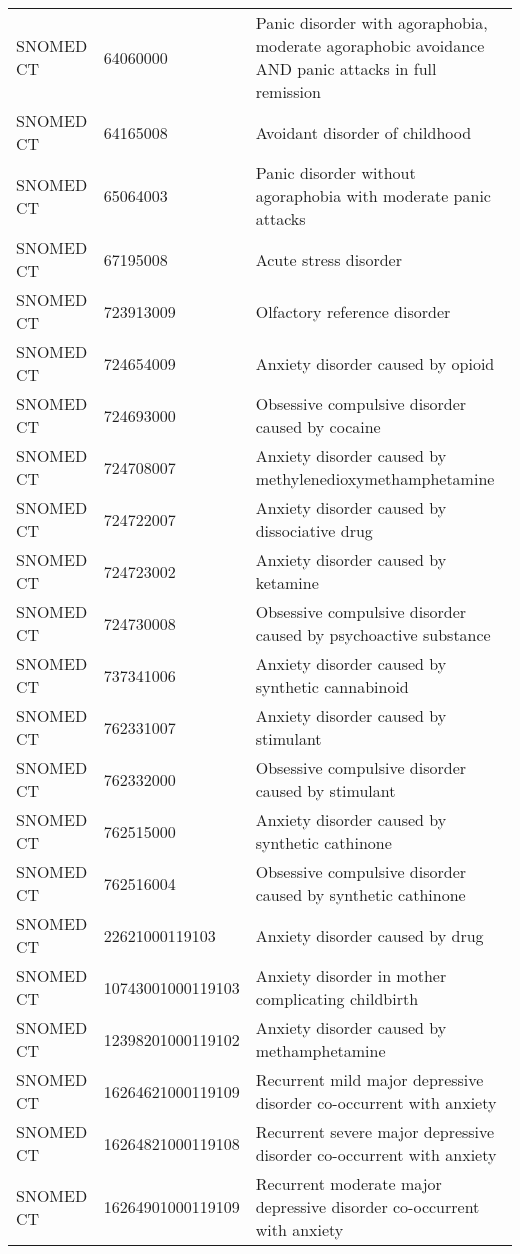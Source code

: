 \begin{longtable}{p{}p{}p{}}
  SNOMED CT & 64060000 & Panic disorder with agoraphobia, moderate agoraphobic avoidance AND panic attacks in full remission \\ 
  SNOMED CT & 64165008 & Avoidant disorder of childhood \\ 
  SNOMED CT & 65064003 & Panic disorder without agoraphobia with moderate panic attacks \\ 
  SNOMED CT & 67195008 & Acute stress disorder \\ 
  SNOMED CT & 723913009 & Olfactory reference disorder \\ 
  SNOMED CT & 724654009 & Anxiety disorder caused by opioid \\ 
  SNOMED CT & 724693000 & Obsessive compulsive disorder caused by cocaine \\ 
  SNOMED CT & 724708007 & Anxiety disorder caused by methylenedioxymethamphetamine \\ 
  SNOMED CT & 724722007 & Anxiety disorder caused by dissociative drug \\ 
  SNOMED CT & 724723002 & Anxiety disorder caused by ketamine \\ 
  SNOMED CT & 724730008 & Obsessive compulsive disorder caused by psychoactive substance \\ 
  SNOMED CT & 737341006 & Anxiety disorder caused by synthetic cannabinoid \\ 
  SNOMED CT & 762331007 & Anxiety disorder caused by stimulant \\ 
  SNOMED CT & 762332000 & Obsessive compulsive disorder caused by stimulant \\ 
  SNOMED CT & 762515000 & Anxiety disorder caused by synthetic cathinone \\ 
  SNOMED CT & 762516004 & Obsessive compulsive disorder caused by synthetic cathinone \\ 
  SNOMED CT & 22621000119103 & Anxiety disorder caused by drug \\ 
  SNOMED CT & 10743001000119103 & Anxiety disorder in mother complicating childbirth \\ 
  SNOMED CT & 12398201000119102 & Anxiety disorder caused by methamphetamine \\ 
  SNOMED CT & 16264621000119109 & Recurrent mild major depressive disorder co-occurrent with anxiety \\ 
  SNOMED CT & 16264821000119108 & Recurrent severe major depressive disorder co-occurrent with anxiety \\ 
  SNOMED CT & 16264901000119109 & Recurrent moderate major depressive disorder co-occurrent with anxiety \\ 

\end{longtable}

